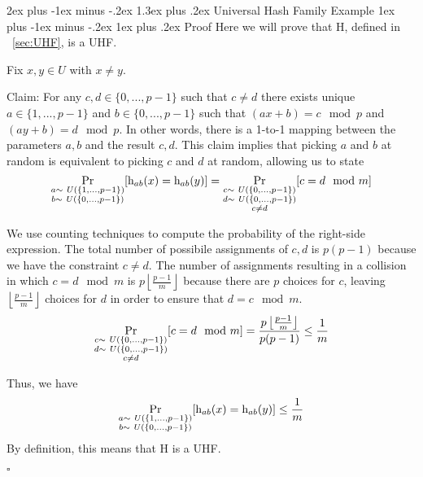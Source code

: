 \documentclass[11pt]{article}
\makeatletter
\renewcommand{\section}{\@startsection{section}{1}{0mm}%
                                 {2ex plus -1ex minus -.2ex}%
                                 {1.3ex plus .2ex}%
                                 {\normalfont\Large\bfseries}}%
\renewcommand{\subsection}{\@startsection{subsection}{2}{0mm}%
                                   {1ex plus -1ex minus -.2ex}%
                                   {1ex plus .2ex}%
                                   {\normalfont\large\bfseries}}%
\newcommand{\pr}{{\bf {\rm Pr}}}
\newcommand{\floor}[1]{\ensuremath{\left\lfloor#1\right\rfloor}}
\newcommand*{\QEDB}{\null\nobreak\hfill\ensuremath{\square}}
\makeatother
\begin{document}
\section{Universal Hash Family Example}
\subsection{Proof}
Here we will prove that $\mathrm{H}$, defined in ~\ref{sec:UHF}, is a UHF.

Fix $x, y \in U$ with $x \neq y$.

Claim: For any $c, d \in \{0, ..., p-1\}$ such that $c \neq d$ there exists unique $a \in \{1, ..., p-1\}$ and $b \in \{0, ..., p-1\}$ such that $(ax+b) = c \mod p$ and $(ay+b) = d \mod p$.
In other words, there is a 1-to-1 mapping between the parameters $a, b$ and the result $c, d$. 
This claim implies that picking $a$ and $b$ at random is equivalent to picking $c$ and $d$ at random, allowing us to state
\[
{\underset{\substack{a\sim\ U(\{1, ..., p-1\}) \\ b\sim\ U(\{0, ..., p-1\})}}{\pr}} [\mathrm{h}_{ab}(x) = \mathrm{h}_{ab}(y)] = 
{\underset{\substack{c\sim\ U(\{0, ..., p-1\}) \\ d\sim\ U(\{0, ..., p-1\}) \\ c \neq d}}{\pr}} [c = d \mod m] 
\]

We use counting techniques to compute the probability of the right-side expression. The total number of possibile assignments of $c, d$ is $p(p-1)$ because we have the constraint $c \neq d$. The number of assignments resulting in a collision in which $c = d\mod m$ is $p \floor{\frac{p-1}{m}}$ because there are $p$ choices for $c$, leaving $\left \lfloor{\frac{p-1}{m}}\right \rfloor$ choices for $d$ in order to ensure that $d = c \mod m$. 
\[
{\underset{\substack{c\sim\ U(\{0, ..., p-1\}) \\ d\sim\ U(\{0, ..., p-1\}) \\ c \neq d}}{\pr}} [c = d \mod m] =
\frac{p \floor{\frac{p-1}{m}}}{p(p-1)} \leq \frac{1}{m}
\]

Thus, we have 
\[
{\underset{\substack{a\sim\ U(\{1, ..., p-1\}) \\ b\sim\ U(\{0, ..., p-1\})}}{\pr}} [\mathrm{h}_{ab}(x) = \mathrm{h}_{ab}(y)] \leq \frac{1}{m}
\]
By definition, this means that $\mathrm{H}$ is a UHF. 

\QEDB
\end{document}
